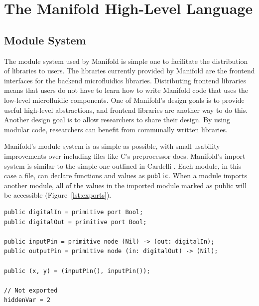 \section{The Manifold High-Level Language}

\subsection{Module System}

The module system used by Manifold is simple one to facilitate the distribution of libraries to
users. The libraries currently provided by Manifold are the frontend interfaces for the backend
microfluidics libraries. Distributing frontend libraries means that users do not have to learn how
to write Manifold code that uses the low-level microfluidic components. One of Manifold's design
goals is to provide useful high-level abstractions, and frontend libraries are another way to do
this. Another design goal is to allow researchers to share their design. By using modular code,
researchers can benefit from communally written libraries.

Manifold's module system is as simple as possible, with small usability improvements over including
files like C's preprocessor does. Manifold's import system is similar to the simple one outlined in
Cardelli \cite{Cardelli:1997:PFL:263699.263735}. Each module, in this case a file, can declare
functions and values as \texttt{public}. When a module imports another module, all of the values in
the imported module marked as public will be accessible (Figure~\ref{lst:exports}).

\begin{lstlisting}[label=lst:exports, caption=Exported values in a Manifold file]
public digitalIn = primitive port Bool;
public digitalOut = primitive port Bool;

public inputPin = primitive node (Nil) -> (out: digitalIn);
public outputPin = primitive node (in: digitalOut) -> (Nil);

public (x, y) = (inputPin(), inputPin());

// Not exported
hiddenVar = 2
\end{lstlisting}

